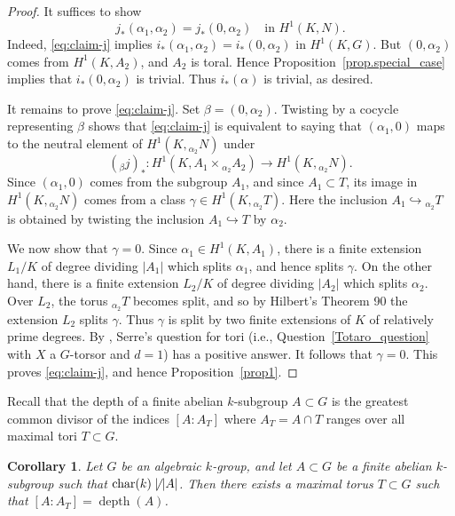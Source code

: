 \documentclass[12pt]{amsart}
\numberwithin{equation}{section}
\newtheorem{corollary}[theorem]{Corollary}
\theoremstyle{remark}
\newcommand{\Char}{\operatorname{char}}
\newcommand{\depth}{\operatorname{depth}}
\begin{document}
\begin{proof}
It suffices to show
\begin{equation}\label{eq:claim-j}
j_*(\alpha_1,\alpha_2)=j_*(0,\alpha_2)
\quad\text{in } H^1(K,N).
\end{equation}
Indeed, \eqref{eq:claim-j} implies 
$i_*(\alpha_1,\alpha_2)=i_*(0,\alpha_2)$ in $H^1(K,G)$. But $(0,\alpha_2)$ comes from
$H^1(K,A_2)$, and $A_2$ is toral. Hence Proposition~\ref{prop.special_case}
implies that $i_*(0,\alpha_2)$ is trivial. Thus $i_*(\alpha)$ is trivial, as desired.

It remains to prove \eqref{eq:claim-j}. Set $\beta=(0,\alpha_2)$. Twisting by
a cocycle representing $\beta$ shows that \eqref{eq:claim-j} is equivalent to saying that $(\alpha_1,0)$ maps to the neutral element of $H^1(K,{}_{\alpha_2}N)$ under
\[
({}_{\beta}j)_*\colon
H^1(K,A_1\times {}_{\alpha_2}A_2)\longrightarrow H^1(K,{}_{\alpha_2}N).
\]
Since $(\alpha_1,0)$ comes from the subgroup $A_1$, and since
$A_1\subset T$, its image in $H^1(K,{}_{\alpha_2}N)$ comes from a class
$\gamma\in H^1(K,{}_{\alpha_2}T)$. Here the inclusion
$A_1\hookrightarrow {}_{\alpha_2}T$ is obtained by twisting the inclusion
$A_1\hookrightarrow T$ by $\alpha_2$.

We now show that $\gamma=0$. Since $\alpha_1\in H^1(K,A_1)$, there is a finite extension $L_1/K$ of degree dividing $|A_1|$
which splits $\alpha_1$, and hence splits $\gamma$. On the other
hand, there is a finite extension $L_2/K$ of degree dividing $|A_2|$ which
splits $\alpha_2$. Over $L_2$, the torus ${}_{\alpha_2}T$ becomes split,
and so by Hilbert's Theorem 90 the extension $L_2$ splits $\gamma$. Thus $\gamma$ is split by two finite extensions of $K$ of relatively prime degrees. By \cite[Lemma 3.1]{gordon-sarney}, Serre's question for tori \cite[Question 2]{serre-pp} (i.e., Question~\ref{Totaro_question} with $X$ a $G$-torsor and $d = 1$) has a positive answer. It follows that $\gamma=0$. This proves
\eqref{eq:claim-j}, and hence Proposition~\ref{prop1}.
\end{proof}

Recall that the depth of a finite abelian $k$-subgroup $A\subset G$ is the greatest common divisor of the indices $[A:A_T]$ where $A_T = A\cap T$ ranges over all maximal tori $T\subset G$.

\begin{corollary}\label{cor.of_prop1}
    Let $G$ be an algebraic $k$-group, and let $A \subset G$ be a finite abelian $k$-subgroup such that $\Char(k)\not\mid |A|$. Then there exists a maximal torus $T\subset G$ such that $[A:A_T] = \depth(A)$.
\end{corollary}
\end{document}
